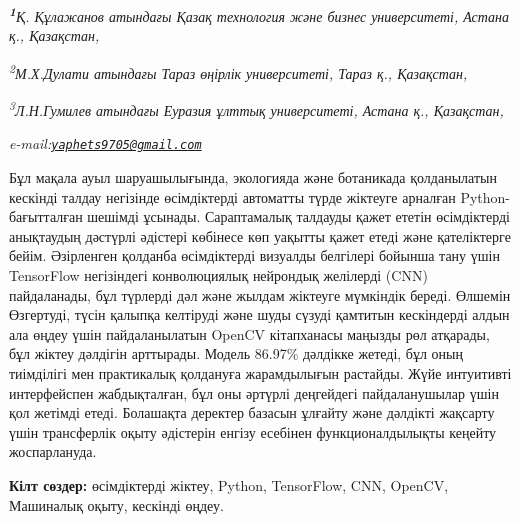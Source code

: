 \begin{affiliation}
\emph{{\bfseries \textsuperscript{1}}Қ. Құлажанов атындағы Қазақ технология және бизнес университеті, Астана қ., Қазақстан,}

\emph{\textsuperscript{2}М.Х.Дулати атындағы Тараз өңірлік университеті, Тараз қ., Қазақстан,}

\emph{\textsuperscript{3}Л.Н.Гумилев атындағы Еуразия ұлттық университеті, Астана қ., Қазақстан,}

\emph{e-mail:\href{mailto:yaphets9705@gmail.com}{\nolinkurl{yaphets9705@gmail.com}}}
\end{affiliation}

Бұл мақала ауыл шаруашылығында, экологияда және ботаникада қолданылатын
кескінді талдау негізінде өсімдіктерді автоматты түрде жіктеуге арналған
Python-бағытталған шешімді ұсынады. Сараптамалық талдауды қажет ететін
өсімдіктерді анықтаудың дәстүрлі әдістері көбінесе көп уақытты қажет
етеді және қателіктерге бейім. Әзірленген қолданба өсімдіктерді визуалды
белгілері бойынша тану үшін TensorFlow негізіндегі конволюциялық
нейрондық желілерді (CNN) пайдаланады, бұл түрлерді дәл және жылдам
жіктеуге мүмкіндік береді. Өлшемін Өзгертуді, түсін қалыпқа келтіруді
және шуды сүзуді қамтитын кескіндерді алдын ала өңдеу үшін
пайдаланылатын OpenCV кітапханасы маңызды рөл атқарады, бұл жіктеу
дәлдігін арттырады. Модель 86.97\% дәлдікке жетеді, бұл оның тиімділігі
мен практикалық қолдануға жарамдылығын растайды. Жүйе интуитивті
интерфейспен жабдықталған, бұл оны әртүрлі деңгейдегі пайдаланушылар
үшін қол жетімді етеді. Болашақта деректер базасын ұлғайту және дәлдікті
жақсарту үшін трансферлік оқыту әдістерін енгізу есебінен
функционалдылықты кеңейту жоспарлануда.

{\bfseries Кілт сөздер:} өсімдіктерді жіктеу, Python, TensorFlow, CNN,
OpenCV, Машиналық оқыту, кескінді өңдеу.

